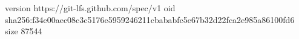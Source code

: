 version https://git-lfs.github.com/spec/v1
oid sha256:f34e00aec08c3c5176e5959246211cbababfc5e67b32d22fca2e985a86100fd6
size 87544
